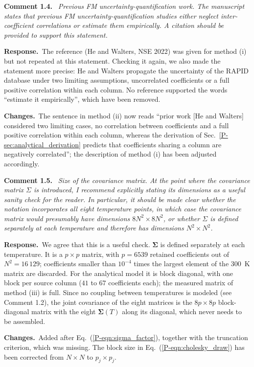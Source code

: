 \documentclass[11pt]{article}
\newenvironment{revcomment}[1]
  {\par\medskip\noindent\textbf{Comment #1.}\ \itshape}
  {\par}
\newcommand{\response}{\par\noindent\textbf{Response.}\ }
\newcommand{\changes}{\par\noindent\textbf{Changes.}\ }
\begin{document}
\begin{revcomment}{1.4}
Previous FM uncertainty-quantification work. The manuscript states that previous FM
uncertainty-quantification studies either neglect inter-coefficient correlations or
estimate them empirically. A citation should be provided to support this statement.
\end{revcomment}
\response The reference (He and Walters, NSE 2022) was given for method (i) but not repeated at this statement. Checking it again, we also made the statement more precise: He and Walters propagate the uncertainty of the RAPID database under two limiting assumptions, uncorrelated coefficients or a full positive correlation within each column. No reference supported the words ``estimate it empirically'', which have been removed.
\changes The sentence in method (ii) now reads ``prior work [He and Walters] considered two limiting cases, no correlation between coefficients and a full positive correlation within each column, whereas the derivation of Sec.~\ref{P-sec:analytical_derivation} predicts that coefficients sharing a column are negatively correlated''; the description of method (i) has been adjusted accordingly.

\begin{revcomment}{1.5}
Size of the covariance matrix. At the point where the covariance matrix $\Sigma$ is
introduced, I recommend explicitly stating its dimensions as a useful sanity check for
the reader. In particular, it should be made clear whether the notation incorporates all
eight temperature points, in which case the covariance matrix would presumably have
dimensions $8N^2\times 8N^2$, or whether $\Sigma$ is defined separately at each
temperature and therefore has dimensions $N^2\times N^2$.
\end{revcomment}
\response We agree that this is a useful check. $\boldsymbol\Sigma$ is defined separately at each temperature. It is a $p\times p$ matrix, with $p=6539$ retained coefficients out of $N^2=16\,129$; coefficients smaller than $10^{-4}$ times the largest element of the 300~K matrix are discarded. For the analytical model it is block diagonal, with one block per source column ($41$ to $67$ coefficients each); the measured matrix of method (iii) is full. Since no coupling between temperatures is modeled (see Comment 1.2), the joint covariance of the eight matrices is the $8p\times8p$ block-diagonal matrix with the eight $\boldsymbol\Sigma(T)$ along its diagonal, which never needs to be assembled.
\changes Added after Eq.~(\ref{P-eqn:sigma_factor}), together with the truncation criterion, which was missing. The block size in Eq.~(\ref{P-eqn:cholesky_draw}) has been corrected from $N\times N$ to $p_j\times p_j$.
\end{document}

